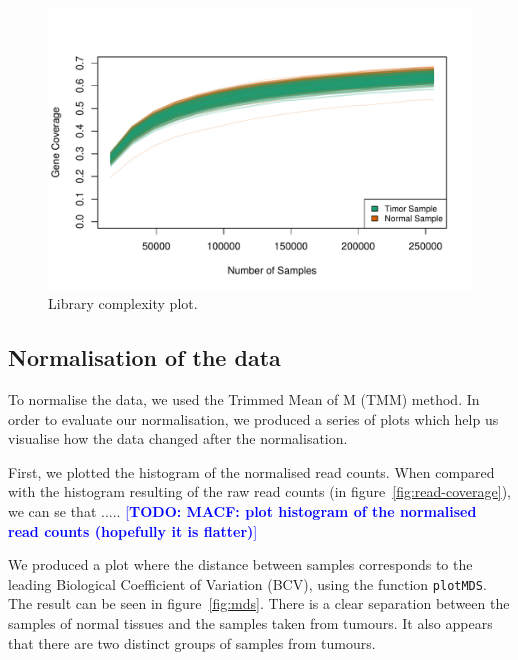 \documentclass[10pt,twocolumn]{article}\usepackage[]{graphicx}\usepackage[]{color}
\makeatletter
\def\maxwidth{ %
  \ifdim\Gin@nat@width>\linewidth
    \linewidth
  \else
    \Gin@nat@width
  \fi
}
\newenvironment{knitrout}{}{} %
\newcommand{\todo}[1]{\textcolor{blue}{[\textbf{TODO: #1}]} }
\makeatother
\begin{document}
\begin{knitrout}
\color{fgcolor}\begin{figure}[ht]

{\centering \includegraphics[width=\maxwidth]{figure/library-complexity-1} 

}

\caption[Library complexity plot]{Library complexity plot.}\label{fig:library-complexity}
\end{figure}


\end{knitrout}

\subsection{Normalisation of the data}
To normalise the data, we used the Trimmed Mean of M (TMM) method. In order to evaluate our normalisation, we produced a series of plots which help us visualise how the data changed after the normalisation.

First, we plotted the histogram of the normalised read counts. When compared with the histogram resulting of the raw read counts (in figure~\ref{fig:read-coverage}), we can se that .....
\todo{MACF: plot histogram of the normalised read counts (hopefully it is flatter)}


We produced a plot where the distance between samples corresponds to the leading Biological Coefficient of Variation (BCV), using the function \texttt{plotMDS}. The result can be seen in figure~\ref{fig:mds}. There is a clear separation between the samples of normal tissues and the samples taken from tumours. It also appears that there are two distinct groups of samples from tumours.
\end{document}
